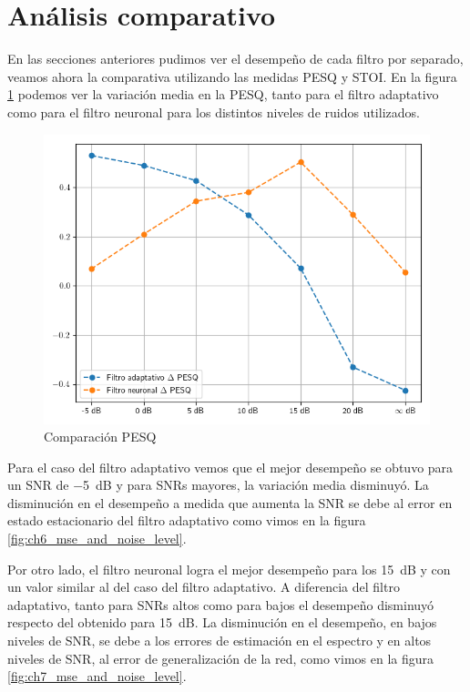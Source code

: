 \section{Análisis comparativo}

En las secciones anteriores pudimos ver el desempeño de cada filtro por separado, veamos ahora la comparativa utilizando las medidas PESQ y STOI. En la figura \ref{fig:ch8_pesq_comparison} podemos ver la variación media en la PESQ, tanto para el filtro adaptativo como para el filtro neuronal para los distintos niveles de ruidos utilizados.

\begin{figure}
	\centering
	\centerline{\includegraphics[scale=0.75]{images/ch8/comparison_pesq.png}}
	\caption{Comparación PESQ}
	\label{fig:ch8_pesq_comparison}
\end{figure}

Para el caso del filtro adaptativo vemos que el mejor desempeño se obtuvo para un SNR de \SI{-5}{dB} y para SNRs mayores, la variación media disminuyó. La disminución en el desempeño a medida que aumenta la SNR se debe al error en estado estacionario del filtro adaptativo como vimos en la figura \ref{fig:ch6_mse_and_noise_level}.

Por otro lado, el filtro neuronal logra el mejor desempeño para los \SI{15}{dB} y con un valor similar al del caso del filtro adaptativo. A diferencia del filtro adaptativo, tanto para SNRs altos como para bajos el desempeño disminuyó respecto del obtenido para \SI{15}{dB}. La disminución en el desempeño, en bajos niveles de SNR, se debe a los errores de estimación en el espectro y en altos niveles de SNR, al error de generalización de la red, como vimos en la figura \ref{fig:ch7_mse_and_noise_level}.	

